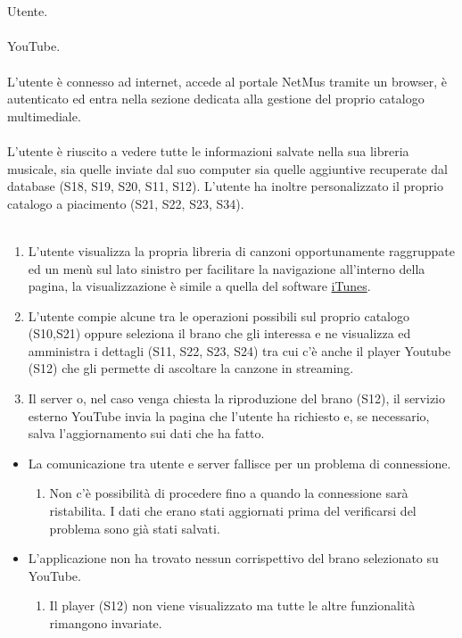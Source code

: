 \newpage
\vspace*{0.5cm}
 \\\\
 Utente. \\\\
 YouTube. \\\\
 L'utente \`e connesso ad internet, accede al portale
NetMus tramite un browser, \`e autenticato ed entra nella sezione dedicata alla
gestione del proprio catalogo multimediale. \\\\ 
 L'utente \`e riuscito a vedere tutte le informazioni
salvate nella sua libreria musicale, sia quelle inviate dal suo computer sia
quelle aggiuntive recuperate dal database (S18, S19, S20, S11, S12). L'utente ha
inoltre personalizzato il proprio catalogo a piacimento (S21, S22, S23, S34).
\\\\
\begin{enumerate}
  \item L'utente visualizza la propria libreria di canzoni
  opportunamente raggruppate ed un men\`u sul lato sinistro per facilitare la
  navigazione all'interno della pagina, la visualizzazione \`e simile a quella
  del software \underline{iTunes}.
  \item L'utente compie alcune tra le operazioni possibili sul proprio
  catalogo (S10,S21) oppure seleziona il brano che gli interessa e ne
  visualizza ed amministra i dettagli (S11, S22, S23, S24) tra cui c'\`e anche
  il player Youtube (S12) che gli permette di ascoltare la canzone in streaming.
  \item Il server o, nel caso venga chiesta la riproduzione del brano (S12), il
  servizio esterno YouTube invia la pagina che l'utente ha richiesto e, se
  necessario, salva l'aggiornamento sui dati che ha fatto.
\end{enumerate}
\begin{itemize}
  \item La comunicazione tra utente e server fallisce per un problema di
  connessione.
  \begin {enumerate}
    \item Non c'\`e possibilit\`a di procedere fino a quando la connessione sar\`a
    ristabilita. I dati che erano stati aggiornati prima del verificarsi del
    problema sono gi\`a stati salvati.
  \end{enumerate}
  \item L'applicazione non ha trovato nessun corrispettivo del brano
  selezionato su YouTube.
  \begin {enumerate}
    \item Il player (S12) non viene visualizzato ma tutte le altre
    funzionalit\`a rimangono invariate.
  \end{enumerate}
\end{itemize}
\newpage


